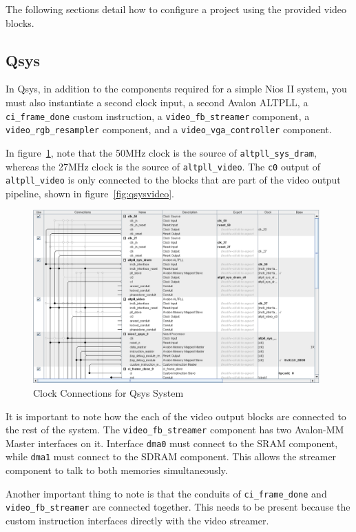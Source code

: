 \documentclass{capstonedoc}
\begin{document}
The following sections detail how to configure a project using the provided
video blocks.

\subsection{Qsys}

In Qsys, in addition to the components required for a simple Nios II system, you
must also instantiate a second clock input, a second Avalon ALTPLL, a
\texttt{ci\_frame\_done} custom instruction, a \texttt{video\_fb\_streamer}
component, a \texttt{video\_rgb\_resampler} component, and a
\texttt{video\_vga\_controller} component.

In figure~\ref{fig:qsysclocks}, note that the 50MHz clock is the source of
\texttt{altpll\_sys\_dram}, whereas the 27MHz clock is the source of
\texttt{altpll\_video}. The \texttt{c0} output of \texttt{altpll\_video} is only
connected to the blocks that are part of the video output pipeline, shown in
figure~\ref{fig:qsysvideo}.

\begin{figure}[ht]
  \centering
  \includegraphics[width=11cm]{qsys_connections_clocks}
  \caption{Clock Connections for Qsys System}
  \label{fig:qsysclocks}
\end{figure}

It is important to note how the each of the video output blocks are connected
to the rest of the system. The \texttt{video\_fb\_streamer} component has two
Avalon-MM Master interfaces on it. Interface \texttt{dma0} must connect to the
SRAM component, while \texttt{dma1} must connect to the SDRAM component. This
allows the streamer component to talk to both memories simultaneously.

Another important thing to note is that the conduits of \texttt{ci\_frame\_done}
and \texttt{video\_fb\_streamer} are connected together. This needs to be
present because the custom instruction interfaces directly with the video
streamer.
\end{document}
